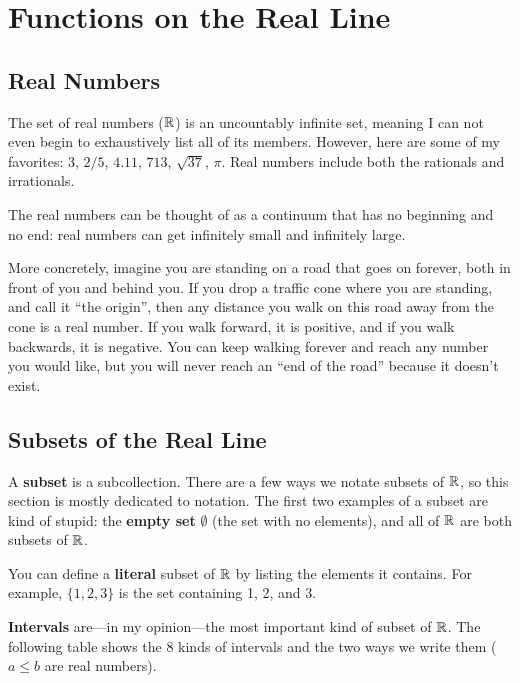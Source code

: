 \section{Functions on the Real Line}
\label{sec:real-functions}

\subsection{Real Numbers}

The set of real numbers ($\mathbb{R}$) is an uncountably infinite set, meaning I can not even begin to exhaustively list all of its members. However, here are some of my favorites: $3$, $2/5$, $4.11$, $713$, $\sqrt{37}$, $\pi$. Real numbers include both the rationals and irrationals. 

The real numbers can be thought of as a continuum that has no beginning and no end: real numbers can get infinitely small and infinitely large.

More concretely, imagine you are standing on a road that goes on forever, both in front of you and behind you. If you drop a traffic cone where you are standing, and call it ``the origin'', then any distance you walk on this road away from the cone is a real number. If you walk forward, it is positive, and if you walk backwards, it is negative. You can keep walking forever and reach any number you would like, but you will never reach an ``end of the road'' because it doesn't exist.

\subsection{Subsets of the Real Line}

A \textbf{subset} is a subcollection. There are a few ways we notate subsets of $\mathbb{R}$, so this section is mostly dedicated to notation. The first two examples of a subset are kind of stupid: the \textbf{empty set} $\emptyset$ (the set with no elements), and all of $\mathbb{R}$ are both subsets of $\mathbb{R}$.

You can define a \textbf{literal} subset of $\mathbb{R}$ by listing the elements it contains. For example, $\{1,2,3\}$ is the set containing 1, 2, and 3.

\textbf{Intervals} are---in my opinion---the most important kind of subset of $\mathbb{R}$. The following table shows the 8 kinds of intervals and the two ways we write them ($a\leq b$ are real numbers).

